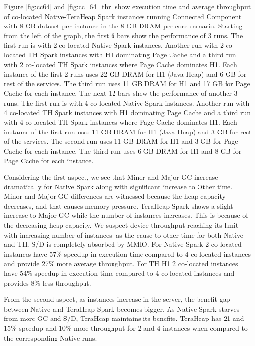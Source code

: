 Figure \ref{fig:cc64} and \ref{fig:cc_64_thr} show execution time and average throughput of co-located
Native-TeraHeap Spark instances running Connected Component with 8 GB
dataset per instance in the 8 GB DRAM per core scenario.
Starting from the left of the graph, the first 6 bars show the
performance of 3 runs. The first run is with 2 co-located Native Spark instances.
Another run with 2 co-located TH Spark instances with H1 dominating Page Cache
and a third run with 2 co-located TH Spark instances where Page Cache dominates H1.
Each instance of the first 2 runs uses 22 GB DRAM for H1 (Java Heap) and 6 GB for rest of the services.
The third run uses 11 GB DRAM for H1 and 17 GB for Page Cache for each instance. 
The next 12 bars show the performance of another 3 runs. The first run is with 4 co-located Native Spark instances.
Another run with 4 co-located TH Spark instances with H1 dominating Page Cache
and a third run with 4 co-located TH Spark instances where Page Cache dominates H1.
Each instance of the first run uses 11 GB DRAM for H1 (Java Heap) and 3 GB for rest of the services.
The second run uses 11 GB DRAM for H1 and 3 GB for Page Cache for each instance.
The third run uses 6 GB DRAM for H1 and 8 GB for Page Cache for each instance.

Considering the first aspect, we see that Minor and Major GC increase dramatically for Native Spark along with significant increase to Other time. Minor and Major GC differences are witnessed because the heap capacity decreases, and that causes memory pressure. TeraHeap Spark shows a slight increase to Major GC while the number of instances increases. This is because of the decreasing heap capacity. We suspect device throughput reaching its limit with increasing number of instances, as the cause to other time for both Native and TH. S/D is completely absorbed by MMIO. For Native Spark 2 co-located instances have 57\% speedup in execution time compared to 4 co-located instances and provide 27\% more average throughput. For TH H1 2 co-located instances have 54\% speedup in execution time compared to 4 co-located instances and provides 8\% less throughput.

From the second aspect, as instances increase in the server, the benefit gap between Native and TeraHeap Spark becomes bigger. As Native Spark starves from more GC and S/D, TeraHeap maintains its benefits. TeraHeap has 21 and 15\% speedup and 10\% more throughput for 2 and 4 instances when compared to the corresponding Native runs.

